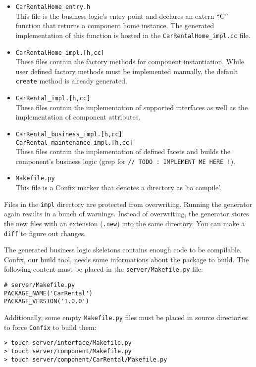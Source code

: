\begin{itemize}
\item {\tt CarRentalHome\_entry.h} \\
This file is the business logic's entry point and declares an extern ``C'' 
function that returns a component home instance.
The generated implementation of this function is hosted in the 
{\tt CarRentalHome\_impl.cc} file.

\item {\tt CarRentalHome\_impl.[h,cc]} \\
These files contain the factory methods for component instantiation. 
While user defined factory methods must be implemented manually, the default 
{\tt create} method is already generated.

\item {\tt CarRental\_impl.[h,cc]} \\
These files contain the implementation of supported interfaces as well as the
implementation of component attributes.

\item {\tt CarRental\_business\_impl.[h,cc]} \\
{\tt CarRental\_maintenance\_impl.[h,cc]} \\
These files contain the implementation of defined facets and builds
the component's business logic
(grep for {\tt // TODO : IMPLEMENT ME HERE !}).

\item {\tt Makefile.py} \\
This file is a Confix marker that denotes a directory as 'to compile'.
\end{itemize}

Files in the {\tt impl} directory are protected from overwriting.
Running the generator again results in a bunch of warnings. 
Instead of overwriting, the generator stores the new files with an extension 
({\tt *.new}) into the same directory.
You can make a {\tt diff} to figure out changes. 

\vspace{3mm}
The generated business logic skeletons contains enough code to be compilable.
Confix, our build tool, needs some informations about the package to build.
The following content must be placed in the {\tt server/Makefile.py} file:
\begin{small}
\begin{verbatim}
# server/Makefile.py
PACKAGE_NAME('CarRental')
PACKAGE_VERSION('1.0.0')
\end{verbatim}
\end{small}
Additionally, some empty {\tt Makefile.py} files must be placed in
source directories to force {\tt Confix} to build them:
\begin{small}
\begin{verbatim}
> touch server/interface/Makefile.py
> touch server/component/Makefile.py
> touch server/component/CarRental/Makefile.py
\end{verbatim}
\end{small}

